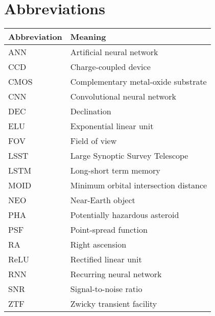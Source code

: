 \section*{Abbreviations}
\begin{table}[h!]
\begin{tabular}{ll}
\textbf{Abbreviation} & \textbf{Meaning}                      \\ \hline
ANN                   & Artificial neural network             \\
CCD                   & Charge-coupled device                 \\
CMOS                  & Complementary metal-oxide substrate   \\
CNN                   & Convolutional neural network          \\
DEC                   & Declination                           \\
ELU                   & Exponential linear unit               \\
FOV                   & Field of view                         \\
LSST                  & Large Synoptic Survey Telescope       \\
LSTM                  & Long-short term memory                \\
MOID                  & Minimum orbital intersection distance \\
NEO                   & Near-Earth object                     \\
PHA                   & Potentially hazardous asteroid        \\
PSF                   & Point-spread function                 \\
RA                    & Right ascension                       \\
ReLU                  & Rectified linear unit                 \\
RNN                   & Recurring neural network              \\
SNR                   & Signal-to-noise ratio                 \\
ZTF                   & Zwicky transient facility            
\end{tabular}
\end{table}
